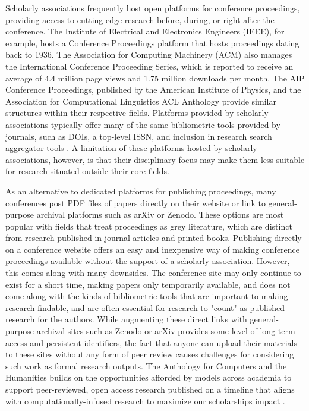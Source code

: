 \documentclass[final]{anthology-ch} %
\begin{document}
Scholarly associations frequently host open platforms for conference
proceedings, providing access to cutting-edge research before, during,
or right after the conference. The Institute of Electrical and
Electronics Engineers (IEEE), for example, hosts a Conference
Proceedings platform that hosts proceedings dating back to 1936. The
Association for Computing Machinery (ACM) also manages the International
Conference Proceeding Series, which is reported to receive an average of
4.4 million page views and 1.75 million downloads per month. The AIP
Conference Proceedings, published by the American Institute of Physics,
and the Association for Computational Linguistics\textquotesingle{} ACL
Anthology provide similar structures within their respective fields.
Platforms provided by scholarly associations typically offer many of the
same bibliometric tools provided by journals, such as DOIs, a top-level
ISSN, and inclusion in research search aggregator tools
\cite{anderson2012towards}. A limitation of
these platforms hosted by scholarly associations, however, is that their
disciplinary focus may make them less suitable for research situated
outside their core fields.

As an alternative to dedicated platforms for publishing proceedings,
many conferences post PDF files of papers directly on their website or
link to general-purpose archival platforms such as arXiv or
Zenodo. These options are most popular with fields that treat
proceedings as grey literature, which are distinct from research
published in journal articles and printed books. Publishing directly on
a conference website offers an easy and inexpensive way of making
conference proceedings available without the support of a scholarly
association. However, this comes along with many downsides. The
conference site may only continue to exist for a short time, making
papers only temporarily available, and does not come along with the
kinds of bibliometric tools that are important to making research
findable, and are often essential for research to "count" as published
research for the authors. While augmenting these direct links with
general-purpose archival sites such as Zenodo or arXiv provides some
level of long-term access and persistent identifiers, the fact that
anyone can upload their materials to these sites without any form of
peer review causes challenges for considering such work as formal
research outputs. The Anthology for Computers and the Humanities builds
on the opportunities afforded by models across academia to support
peer-reviewed, open access research published on a timeline that aligns
with computationally-infused research to maximize our
scholarship\textquotesingle s impact \cite{bosman2021oa, suber2012open}.
\end{document}

